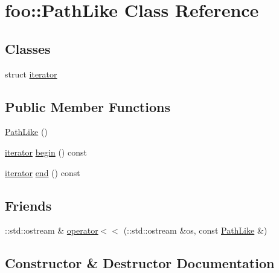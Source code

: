 \hypertarget{classfoo_1_1PathLike}{}\section{foo\+::Path\+Like Class Reference}
\label{classfoo_1_1PathLike}
\subsection*{Classes}
\begin{DoxyCompactItemize}
\item 
struct \mbox{\hyperlink{structfoo_1_1PathLike_1_1iterator}{iterator}}
\end{DoxyCompactItemize}
\subsection*{Public Member Functions}
\begin{DoxyCompactItemize}
\item 
\mbox{\hyperlink{classfoo_1_1PathLike_a1fa696ea0514127f1a57cecd28bd08dc}{Path\+Like}} ()
\item 
\mbox{\hyperlink{structfoo_1_1PathLike_1_1iterator}{iterator}} \mbox{\hyperlink{classfoo_1_1PathLike_a7ca8b63139fd6fcada55fbf13ccf9c83}{begin}} () const
\item 
\mbox{\hyperlink{structfoo_1_1PathLike_1_1iterator}{iterator}} \mbox{\hyperlink{classfoo_1_1PathLike_aca85cd005890f1d19f416ca7e2c95f02}{end}} () const
\end{DoxyCompactItemize}
\subsection*{Friends}
\begin{DoxyCompactItemize}
\item 
\+::std\+::ostream \& \mbox{\hyperlink{classfoo_1_1PathLike_ab5544a5497a8a470802bd8fcf97c49da}{operator$<$$<$}} (\+::std\+::ostream \&os, const \mbox{\hyperlink{classfoo_1_1PathLike}{Path\+Like}} \&)
\end{DoxyCompactItemize}


\subsection{Constructor \& Destructor Documentation}
\mbox{\label{classfoo_1_1PathLike_a1fa696ea0514127f1a57cecd28bd08dc}} 

